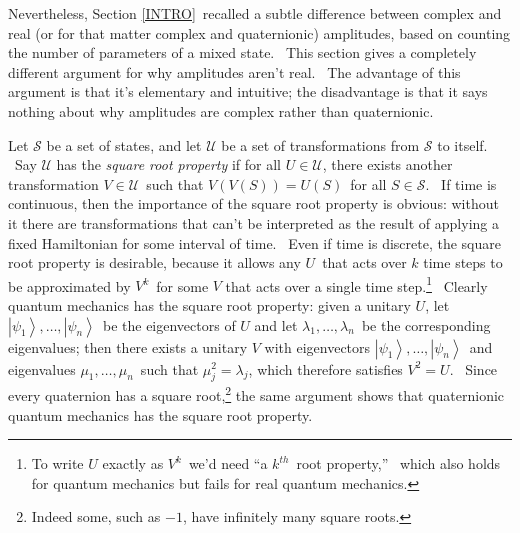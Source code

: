 \documentclass{article}%
\begin{document}
Nevertheless, Section \ref{INTRO}\ recalled a subtle difference between
complex and real (or for that matter complex and quaternionic) amplitudes,
based on counting the number of parameters of a mixed state. \ This section
gives a completely different argument for why amplitudes aren't real. \ The
advantage of this argument is that it's elementary and intuitive; the
disadvantage is that it says nothing about why amplitudes are complex rather
than quaternionic.

Let $\mathcal{S}$ be a set of states, and let $\mathcal{U}$ be a set of
transformations from $\mathcal{S}$ to itself. \ Say $\mathcal{U}$ has the
\textit{square root property} if for all $U\in\mathcal{U}$, there exists
another transformation $V\in\mathcal{U}$\ such that $V\left(  V\left(
S\right)  \right)  =U\left(  S\right)  $\ for all $S\in\mathcal{S}$. \ If time
is continuous, then the importance of the square root property is obvious:
without it there are transformations that can't be interpreted as the result
of applying a fixed Hamiltonian for some interval of time. \ Even if time is
discrete, the square root property is desirable, because it allows any
$U$\ that acts over $k$ time steps to be approximated by $V^{k}$\ for some $V$
that acts over a single time step.\footnote{To write $U$ exactly as $V^{k}%
$\ we'd need \textquotedblleft a $k^{th}$\ root property,\textquotedblright
\ which also holds for quantum mechanics but fails for real quantum
mechanics.} \ Clearly quantum mechanics has the square root property: given a
unitary $U$, let $\left\vert \psi_{1}\right\rangle ,\ldots,\left\vert \psi
_{n}\right\rangle $\ be the eigenvectors of $U$ and let $\lambda_{1}%
,\ldots,\lambda_{n}$\ be the corresponding eigenvalues; then there exists a
unitary $V$ with eigenvectors $\left\vert \psi_{1}\right\rangle ,\ldots
,\left\vert \psi_{n}\right\rangle $\ and eigenvalues $\mu_{1},\ldots,\mu_{n}%
$\ such that $\mu_{j}^{2}=\lambda_{j}$, which therefore satisfies $V^{2}=U$.
\ Since every quaternion has a square root,\footnote{Indeed some, such as
$-1$, have infinitely many square roots.} the same argument shows that
quaternionic quantum mechanics has the square root property.
\end{document}
